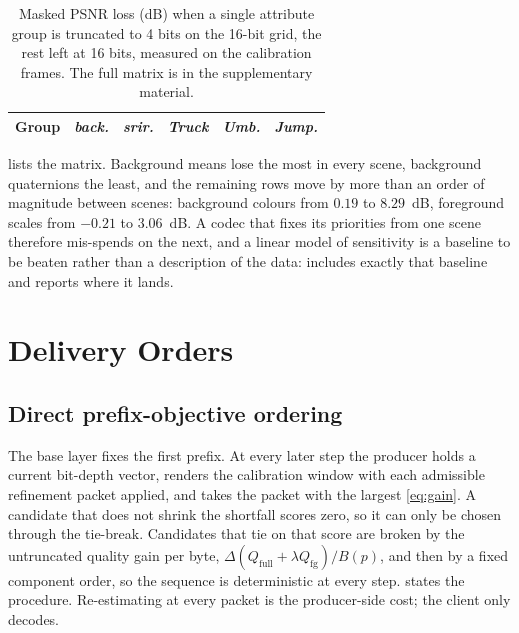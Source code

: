 \documentclass[lettersize,journal]{IEEEtran}
\begin{document}
\begin{table}[t]
\centering
\caption{Masked PSNR loss (dB) when a single attribute group is truncated to
4 bits on the 16-bit grid, the rest left at 16 bits, measured on the calibration
frames. The full matrix is in the supplementary material.}
\label{tab:sens}
\footnotesize
\setlength{\tabcolsep}{3.0pt}
\begin{tabular}{@{}lccccc@{}}
\toprule
Group & \emph{back.} & \emph{srir.} & \emph{Truck} & \emph{Umb.} & \emph{Jump.}\\
\midrule

\end{tabular}
\end{table}

 lists the matrix. Background means lose the most in every scene,
background quaternions the least, and the remaining rows move by more than an
order of magnitude between scenes: background colours from $0.19$ to $8.29$~dB,
foreground scales from $-0.21$ to $3.06$~dB. A codec that fixes its priorities
from one scene therefore mis-spends on the next, and a linear model of
sensitivity is a baseline to be beaten rather than a description of the data:
 includes exactly that baseline and reports where it lands.

\section{Delivery Orders}
\label{sec:orders}

\subsection{Direct prefix-objective ordering}
\label{sec:direct}
The base layer fixes the first prefix. At every later step the producer holds a
current bit-depth vector, renders the calibration window with each admissible
refinement packet applied, and takes the packet with the largest
\eqref{eq:gain}. A candidate that does not shrink the shortfall scores zero, so
it can only be chosen through the tie-break. Candidates that tie on that score
are broken by the untruncated quality gain per byte,
$\Delta(Q_{\text{full}}+\lambda Q_{\text{fg}})/B(p)$, and then by a fixed
component order, so the sequence is deterministic at every step.  states the
procedure. Re-estimating at every packet is the producer-side cost; the client
only decodes.
\end{document}
